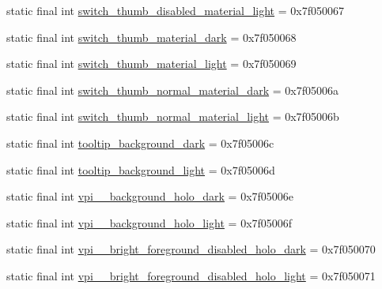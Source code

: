 \begin{DoxyCompactItemize}
\item 
static final int \mbox{\hyperlink{classcom_1_1synnapps_1_1carouselview_1_1_r_1_1color_aee87d3a24b644ce0b0d4e72377fa792a}{switch\+\_\+thumb\+\_\+disabled\+\_\+material\+\_\+light}} = 0x7f050067
\item 
static final int \mbox{\hyperlink{classcom_1_1synnapps_1_1carouselview_1_1_r_1_1color_a8ad956c7964fb6e4e60601187d8df7a3}{switch\+\_\+thumb\+\_\+material\+\_\+dark}} = 0x7f050068
\item 
static final int \mbox{\hyperlink{classcom_1_1synnapps_1_1carouselview_1_1_r_1_1color_acdedc1a253e353870cfb212451af0f6d}{switch\+\_\+thumb\+\_\+material\+\_\+light}} = 0x7f050069
\item 
static final int \mbox{\hyperlink{classcom_1_1synnapps_1_1carouselview_1_1_r_1_1color_a3c087275725aa275be9319a5c5518ead}{switch\+\_\+thumb\+\_\+normal\+\_\+material\+\_\+dark}} = 0x7f05006a
\item 
static final int \mbox{\hyperlink{classcom_1_1synnapps_1_1carouselview_1_1_r_1_1color_a447af10c49894020f07591b09dd0342d}{switch\+\_\+thumb\+\_\+normal\+\_\+material\+\_\+light}} = 0x7f05006b
\item 
static final int \mbox{\hyperlink{classcom_1_1synnapps_1_1carouselview_1_1_r_1_1color_a29848efb741220365a9b02d29a35b7b9}{tooltip\+\_\+background\+\_\+dark}} = 0x7f05006c
\item 
static final int \mbox{\hyperlink{classcom_1_1synnapps_1_1carouselview_1_1_r_1_1color_a3352a4361493685a44aa773b178f7c9a}{tooltip\+\_\+background\+\_\+light}} = 0x7f05006d
\item 
static final int \mbox{\hyperlink{classcom_1_1synnapps_1_1carouselview_1_1_r_1_1color_ab6980fd3122524222e2b6c4a3aec0e45}{vpi\+\_\+\+\_\+background\+\_\+holo\+\_\+dark}} = 0x7f05006e
\item 
static final int \mbox{\hyperlink{classcom_1_1synnapps_1_1carouselview_1_1_r_1_1color_a9385804ec25ab5a5faa1d475e1a2a6c4}{vpi\+\_\+\+\_\+background\+\_\+holo\+\_\+light}} = 0x7f05006f
\item 
static final int \mbox{\hyperlink{classcom_1_1synnapps_1_1carouselview_1_1_r_1_1color_a7bebcf59a303fa2708751abe4a8f7236}{vpi\+\_\+\+\_\+bright\+\_\+foreground\+\_\+disabled\+\_\+holo\+\_\+dark}} = 0x7f050070
\item 
static final int \mbox{\hyperlink{classcom_1_1synnapps_1_1carouselview_1_1_r_1_1color_a775ef23f98553425c0ef62428aff2879}{vpi\+\_\+\+\_\+bright\+\_\+foreground\+\_\+disabled\+\_\+holo\+\_\+light}} = 0x7f050071
\item 

\end{DoxyCompactItemize}

